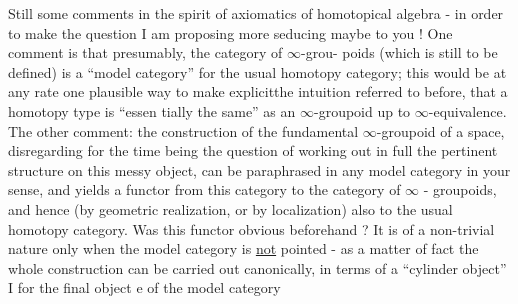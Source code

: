Still some comments in the spirit of  axiomatics of homotopical
algebra - in order to make the question I am proposing more seducing
maybe to you ! One comment is that presumably, the category of $\infty$-grou-%
poids (which is still to be defined) is a ``model category'' for the usual
homotopy category; this would be at any rate one plausible way to make
explicit\hand{\unsure{|}}the intuition referred to before, that a homotopy type is ``essen%
tially the same'' as an $\infty$-groupoid up to $\infty$-equivalence. The other
comment: the construction of the fundamental $\infty$-groupoid of a space,
disregarding for the time being the question of working out in full the
pertinent structure on this messy object, can be paraphrased in any model
category in your sense, and yields a functor from this category to the
category of $\infty$ - groupoids, and hence (by geometric realization, or
by localization) also to the usual homotopy category. Was this functor
obvious beforehand ? It is of a non-trivial nature only when the model
category is \uline{not} pointed - as a matter of fact the whole construction
can be carried out canonically, in terms of a ``cylinder object'' I for
the final object e of the model category\hand{,} 

